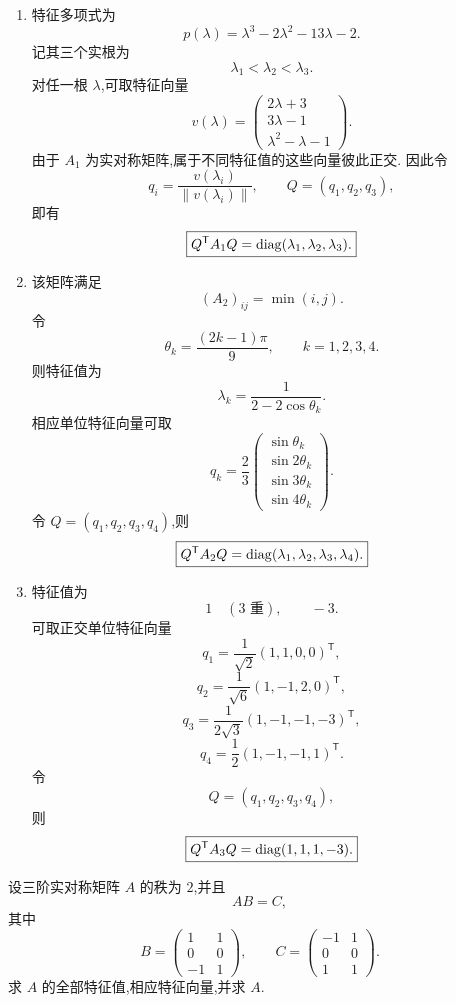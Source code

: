 \begin{solution}
\leavevmode
\begin{enumerate}
    \item 特征多项式为
    \[
    p(\lambda)
    =
    \lambda^3-2\lambda^2-13\lambda-2.
    \]
    记其三个实根为
    \[
    \lambda_1<\lambda_2<\lambda_3.
    \]
    对任一根 $\lambda$,可取特征向量
    \[
    v(\lambda)=
    \begin{pmatrix}
    2\lambda+3\\
    3\lambda-1\\
    \lambda^2-\lambda-1
    \end{pmatrix}.
    \]
    由于 $A_1$ 为实对称矩阵,属于不同特征值的这些向量彼此正交.
    因此令
    \[
    q_i=\dfrac{v(\lambda_i)}{\|v(\lambda_i)\|},
    \qquad
    Q=(q_1,q_2,q_3),
    \]
    即有
    \[
    \boxed{
    Q^{\mathsf T}A_1Q
    =
    \operatorname{diag}(\lambda_1,\lambda_2,\lambda_3).
    }
    \]

    \item 该矩阵满足
    \[
    (A_2)_{ij}=\min(i,j).
    \]
    令
    \[
    \theta_k=\dfrac{(2k-1)\pi}{9},
    \qquad k=1,2,3,4.
    \]
    则特征值为
    \[
    \boxed{
    \lambda_k=
    \dfrac{1}{2-2\cos\theta_k}.
    }
    \]
    相应单位特征向量可取
    \[
    q_k=
    \dfrac23
    \begin{pmatrix}
    \sin\theta_k\\
    \sin2\theta_k\\
    \sin3\theta_k\\
    \sin4\theta_k
    \end{pmatrix}.
    \]
    令 $Q=(q_1,q_2,q_3,q_4)$,则
    \[
    \boxed{
    Q^{\mathsf T}A_2Q
    =
    \operatorname{diag}(\lambda_1,\lambda_2,\lambda_3,\lambda_4).
    }
    \]

    \item 特征值为
    \[
    1\quad(3\text{ 重}),\qquad -3.
    \]
    可取正交单位特征向量
    \[
    q_1=\dfrac1{\sqrt2}(1,1,0,0)^{\mathsf T},
    \]
    \[
    q_2=\dfrac1{\sqrt6}(1,-1,2,0)^{\mathsf T},
    \]
    \[
    q_3=\dfrac1{2\sqrt3}(1,-1,-1,-3)^{\mathsf T},
    \]
    \[
    q_4=\dfrac12(1,-1,-1,1)^{\mathsf T}.
    \]
    令
    \[
    Q=(q_1,q_2,q_3,q_4),
    \]
    则
    \[
    \boxed{
    Q^{\mathsf T}A_3Q=\operatorname{diag}(1,1,1,-3).
    }
    \]
\end{enumerate}
\end{solution}


\begin{example}
设三阶实对称矩阵 $A$ 的秩为 $2$,并且
\[
AB=C,
\]
其中
\[
B=
\begin{pmatrix}
1&1\\
0&0\\
-1&1
\end{pmatrix},
\qquad
C=
\begin{pmatrix}
-1&1\\
0&0\\
1&1
\end{pmatrix}.
\]
求 $A$ 的全部特征值,相应特征向量,并求 $A$.
\end{example}
\exampleblank

